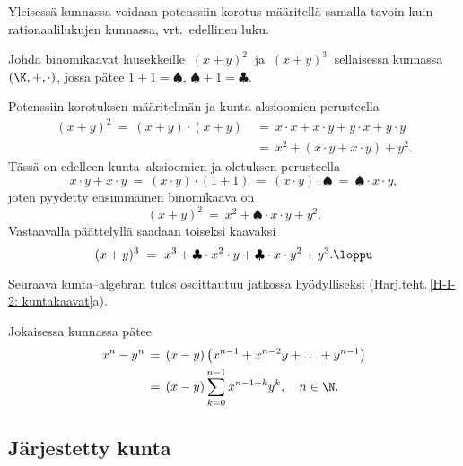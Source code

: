 Yleisessä kunnassa voidaan potenssiin korotus määritellä samalla tavoin kuin rationaalilukujen 
kunnassa, vrt.\ edellinen luku.
\begin{Exa} Johda binomikaavat lausekkeille $\ (x+y)^2\ $ ja $\ (x+y)^3\ $ sellaisessa kunnassa
$(\K,+,\cdot)$, jossa pätee $1+1 = \spadesuit$, $\spadesuit+1 = \clubsuit$. \end{Exa}
\ratk Potenssiin korotuksen määritelmän ja kunta-aksioomien perusteella
\begin{align*}
(x+y)^2\ =\ (x+y) \cdot (x+y)\ &=\ x \cdot x + x \cdot y + y \cdot x + y \cdot y \\
                               &=\ x^2 + (x \cdot y + x \cdot y) + y^2.
\end{align*}
Tässä on edelleen kunta--aksioomien ja oletuksen perusteella
\[
x \cdot y + x \cdot y\ =\ (x \cdot y) \cdot (1+1)\ 
                       =\ (x \cdot y) \cdot \spadesuit\ =\ \spadesuit \cdot x \cdot y,
\]
joten pyydetty ensimmäinen binomikaava on
\[
(x+y)^2\ =\ x^2 + \spadesuit \cdot x \cdot y + y^2.
\]
Vastaavalla päättelyllä saadaan toiseksi kaavaksi
\[
(x+y)^3\ =\ x^3 + \clubsuit \cdot x^2 \cdot y + \clubsuit \cdot x \cdot y^2 + y^3. \loppu
\]

Seuraava kunta--algebran tulos osoittautuu jatkossa hyödylliseksi
(Harj.teht.\,\ref{H-I-2: kuntakaavat}a).
\begin{Prop} \label{kuntakaava} Jokaisessa kunnassa pätee
\begin{align*}
x^n-y^n\, &=\, (x-y)\left(x^{n-1}+x^{n-2}y + \ldots + y^{n-1}\right) \\
          &=\, (x-y)\sum_{k=0}^{n-1} x^{n-1-k}y^k, \quad n\in\N.
\end{align*} \end{Prop}
 
\subsection{Järjestetty kunta}
%

